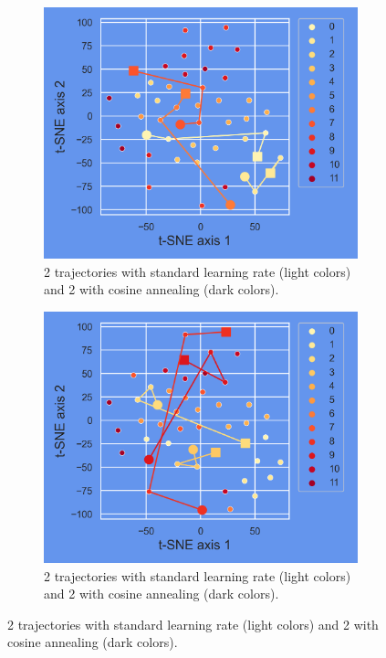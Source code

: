 \begin{figure}[H]
	\centering
	\begin{subfigure}{.45\textwidth}
		\centering
		\includegraphics[width=.9\linewidth]{./figs/preds_tSNE_0.png}  
		\caption{2 trajectories with standard learning rate (light colors) and 2 with cosine annealing (dark colors).}
		\label{fig:sub-first}
	\end{subfigure}
	\begin{subfigure}{.45\textwidth}
		\centering
		\includegraphics[width=.9\linewidth]{./figs/preds_tSNE_1.png}  
		\caption{2 trajectories with standard learning rate (light colors) and 2 with cosine annealing (dark colors).}
		\label{fig:sub-second}
	\end{subfigure}	

\end{figure}
